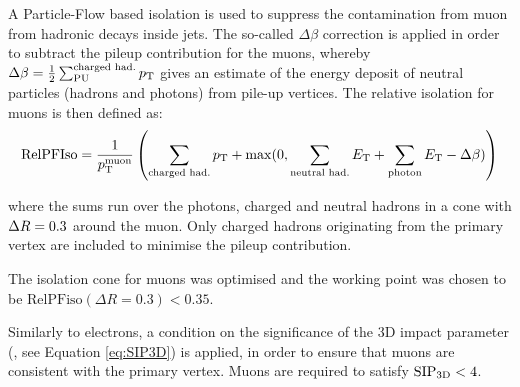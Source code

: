 A Particle-Flow based isolation is used to suppress the contamination from muon from hadronic decays inside jets.
The so-called $\Delta\beta$ correction is applied in order to subtract the pileup contribution for the muons, 
whereby $\Delta\beta = \frac{1}{2} \sum^\text{charged had.}_\text{PU} p_{\mathrm{T}}$ gives an estimate of the energy deposit of neutral particles (hadrons and photons) from pile-up vertices.
The relative isolation for muons is then defined as:
\begin{equation}
\text{RelPFIso} = \frac{1}{p_{\mathrm{T}}^\text{muon}} \left( \sum_\text{charged had.} p_{\mathrm{T}} + \max(0, \sum_\text{neutral had.} E_{\mathrm{T}} + \sum_\text{photon} E_{\mathrm{T}} - \Delta \beta) \right)
\label{eqn:mupfiso}
\end{equation}

where the sums run over the photons, charged and neutral hadrons in a cone with $\Delta R = 0.3$ around the muon.
Only charged hadrons originating from the primary vertex are included to minimise the pileup contribution.

The isolation cone for muons was optimised and the working point was chosen to be $\text{RelPFiso}(\Delta R = 0.3) < 0.35$. 

Similarly to electrons, a condition on the significance of the 3D impact parameter (\SIPthreeD, see Equation \ref{eq:SIP3D}) is applied,
in order to ensure that muons are consistent with the primary vertex.
Muons are required to satisfy $\mathrm{SIP}_{\mathrm{3D}} < 4$.
